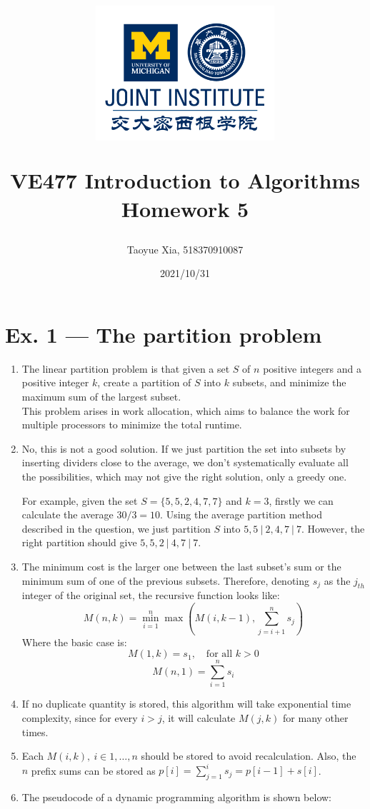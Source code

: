 \documentclass[12pt, a4paper]{article}
\title{
    \begin{figure}[H]
        \centering
        \includegraphics[width=7cm, height=5cm]{AAA.png}
    \end{figure}
    VE477 Introduction to Algorithms\\ 
    Homework 5}
\author{Taoyue Xia, 518370910087}
\date{2021/10/31}
\begin{document}
\maketitle

\newpage

\section*{Ex. 1 --- The partition problem}
\begin{enumerate}
    \item The linear partition problem is that given a set $S$ of $n$ positive integers and a positive integer $k$, 
          create a partition of $S$ into $k$ subsets, and minimize the maximum sum of the largest subset.\\
          This problem arises in work allocation, which aims to balance the work for multiple processors to minimize the total runtime.
    \item No, this is not a good solution. If we just partition the set into subsets by inserting dividers close to the average, 
          we don't systematically evaluate all the possibilities, which may not give the right solution, only a greedy one.

          For example, given the set $S = \{5,5,2,4,7,7\}$ and $k = 3$, firstly we can calculate the average $30/3 = 10$. 
          Using the average partition method described in the question, we just partition $S$ into $5,5\ |\ 2,4,7\ |\ 7$. 
          However, the right partition should give $5,5,2\ |\ 4,7\ |\ 7$.
    \item The minimum cost is the larger one between the last subset's sum or the minimum sum of one of the previous subsets. 
          Therefore, denoting $s_j$ as the $j_{th}$ integer of the original set, the recursive function looks like:
          $$M(n, k) = \min_{i=1}^{n} \max(M(i, k-1), \sum_{j=i+1}^n s_j)$$
          Where the basic case is:
          $$M(1, k) = s_1,\quad \text{for all } k>0$$
          $$M(n, 1) = \sum_{i=1}^n s_i$$
    \item If no duplicate quantity is stored, this algorithm will take exponential time complexity, since for every $i > j$, 
          it will calculate $M(j, k)$ for many other times.
    \item Each $M(i, k),\ i\in{1,\dots,n}$ should be stored to avoid recalculation. 
          Also, the $n$ prefix sums can be stored as $p[i] = \sum_{j=1}^i s_j = p[i-1] + s[i]$.
          \newpage
    \item The pseudocode of a dynamic programming algorithm is shown below:
          

\end{enumerate}
\end{document}
